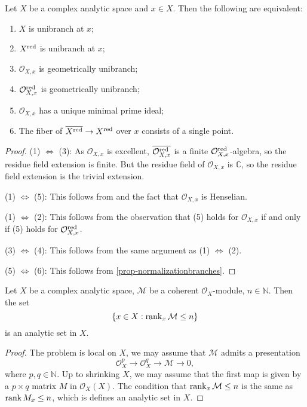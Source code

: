\begin{proposition}\label{prop-unibranchchar}
    Let $X$ be a complex analytic space and $x\in X$. Then the following are equivalent:
    \begin{enumerate}
        \item $X$ is unibranch at $x$;
        \item $X^{\operatorname{red}}$ is unibranch at $x$;
        \item $\mathcal{O}_{X,x}$ is geometrically unibranch;
        \item $\mathcal{O}_{X,x}^{\operatorname{red}}$ is geometrically unibranch;
        \item $\mathcal{O}_{X,x}$ has a unique minimal prime ideal;
        \item The fiber of $\overline{X^{\operatorname{red}}}\rightarrow X^{\operatorname{red}}$ over $x$ consists of a single point.
    \end{enumerate}
\end{proposition}
\begin{proof}
    (1) $\Leftrightarrow$ (3): As $\mathcal{O}_{X,x}$ is excellent, $\overline{\mathcal{O}_{X,x}^{\operatorname{red}}}$ is a finite $\mathcal{O}_{X,x}^{\operatorname{red}}$-algebra, so the residue field extension is finite. But the residue field of $\mathcal{O}_{X,x}$ is $\mathbb{C}$, so the residue field extension is the trivial extension.

    (1) $\Leftrightarrow$ (5): This follows from \cite[\href{https://stacks.math.columbia.edu/tag/0BQ0}{Tag 0BQ0}]{stacks-project} and the fact that $\mathcal{O}_{X,x}$ is Henselian.

    (1) $\Leftrightarrow$ (2): This follows from the observation that (5) holds for $\mathcal{O}_{X,x}$ if and only if (5) holds for $\mathcal{O}_{X,x}^{\operatorname{red}}$. 

    (3) $\Leftrightarrow$ (4): This follows from the same argument as (1) $\Leftrightarrow$ (2).

    (5) $\Leftrightarrow$ (6): This follows from \cref{prop-normalizationbranches}.
\end{proof}

\begin{lemma}\label{lma-rankgeqnana}
    Let $X$ be a complex analytic space, $\mathcal{M}$ be a coherent $\mathcal{O}_X$-module, $n\in \mathbb{N}$. Then the set
    \[
        \left\{x\in X: \rank_x \mathcal{M}\leq  n \right\}  
    \]
    is an analytic set in $X$.
\end{lemma}
\begin{proof}
    The problem is local on $X$, we may assume that $\mathcal{M}$ admits a presentation
    \[  
        \mathcal{O}_X^p\rightarrow \mathcal{O}_X^q\rightarrow \mathcal{M}\rightarrow 0,
    \]  
    where $p,q\in \mathbb{N}$. Up to shrinking $X$, we may assume that the first map is given by a $p\times q$ matrix $M$ in $\mathcal{O}_X(X)$. The condition that $\rank_x \mathcal{M}\leq  n$ is the same as $\rank M_x\leq n$, which is defines an analytic set in $X$.
\end{proof}

